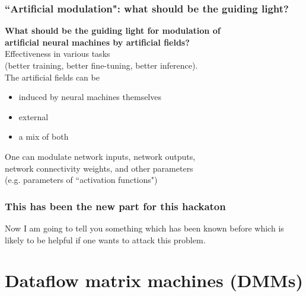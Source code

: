 \documentclass{beamer}
\begin{document}
\begin{frame}

\frametitle{``Artificial modulation": what should be the guiding light?}

{\bf What should be the guiding light for modulation of\\ artificial neural machines by
artificial fields?}\\[2ex]

Effectiveness in various tasks\\ (better training, better fine-tuning, better inference).\\[2ex]

The artificial fields can be

\begin{itemize}
\item induced by neural machines themselves
\item external
\item a mix of both\\[2ex]
\end{itemize}

One can modulate network inputs, network outputs,\\ network connectivity weights,
and other parameters\\ (e.g. parameters of ``activation functions")

\end{frame}

\begin{frame}

\frametitle{This has been the new part for this hackaton}

Now I am going to tell you something which has been known before which is likely to be helpful
if one wants to attack this problem.

\end{frame}

\section{Dataflow matrix machines (DMMs)}
\end{document}
